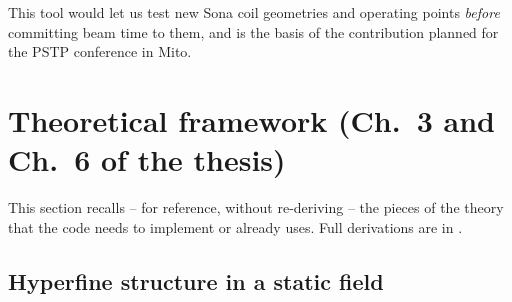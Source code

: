 \documentclass[11pt,a4paper]{article}
\begin{document}
This tool would let us test new Sona coil geometries and operating points
\emph{before} committing beam time to them, and is the basis of the
contribution planned for the PSTP conference in Mito.

\section{Theoretical framework (Ch.~3 and Ch.~6 of the thesis)}

This section recalls -- for reference, without re-deriving -- the pieces of
the theory that the code needs to implement or already uses. Full
derivations are in \cite{kannis2023}.

\subsection{Hyperfine structure in a static field}
\label{sec:groundvsmeta}
\end{document}

